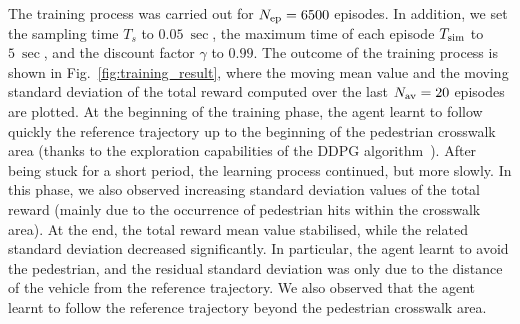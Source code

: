The training process was carried out for $N_{\rm ep}=6500$ episodes. 
In addition, we set the sampling time  $T_s$ to $\SI{0.05}{\sec}$, the maximum time of each episode $T_{\rm sim}$  to $\SI{5}{\sec}$, and the discount factor $\gamma$ to $0.99$.
The outcome of the training process is shown in Fig.~\ref{fig:training_result}, where the moving mean value and the moving standard deviation of the total reward computed over the last $N_{\rm av}=20$ episodes are plotted. At the beginning of the training phase, the agent learnt to follow quickly the reference trajectory up to the beginning of the  pedestrian crosswalk area (thanks to  the exploration capabilities of the DDPG algorithm~\cite{DDPG}). After being stuck for a short period, the learning process continued, but more slowly. In this phase, we also observed increasing standard deviation values of the total reward (mainly due to the occurrence of pedestrian hits within the crosswalk area). At the end, the total reward mean value stabilised, while the related standard deviation decreased significantly. In particular, the agent learnt to avoid the pedestrian, and the residual standard deviation was only due to the distance of the vehicle from the reference trajectory. We also observed that the agent learnt to follow the reference trajectory beyond the pedestrian crosswalk area.

